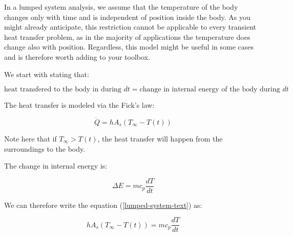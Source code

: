 In a lumped system analysis, we assume that the temperature of the body changes only with time and is independent of position inside the body. As you might already anticipate, this restriction cannot be applicable to every transient heat transfer problem, as in the majority of applications the temperature does change also with position. Regardless, this model might be useful in some cases and is therefore worth adding to your toolbox.

We start with stating that:

\begin{equation} \label{lumped-system-text}
\text{heat transfered to the body in during $dt$} = \text{change in internal energy of the body during $dt$}
\end{equation}

The heat transfer is modeled via the Fick's law:

\begin{equation}
\dot{Q} = h A_s (T_{\infty} - T(t))
\end{equation}

Note here that if $T_{\infty} > T(t)$, the heat transfer will happen from the surroundings to the body.

The change in internal energy is:

\begin{equation}
\Delta E = m c_p \frac{dT}{dt}
\end{equation}

We can therefore write the equation (\ref{lumped-system-text}) as:

\begin{equation}
h A_s (T_{\infty} - T(t)) = m c_p \frac{dT}{dt}
\end{equation}